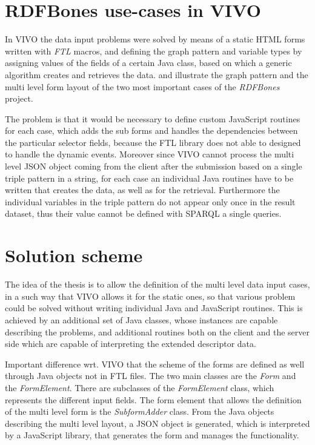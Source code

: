 \section{RDFBones use-cases in VIVO}

In VIVO the data input problems were solved by means of a static HTML forms written with \textit{FTL} macros, and defining the graph pattern and variable types by assigning values of the fields of a certain Java class, based on which a generic algorithm creates and retrieves the data.  and  illustrate the graph pattern and the multi level form layout of the two most important cases of the \textit{RDFBones} project. 



The problem is that it would be necessary to define custom JavaScript routines for each case, which adds the sub forms and handles the dependencies between the particular selector fields, because the FTL library does not able to designed to handle the dynamic events. Moreover since VIVO cannot process the multi level JSON object coming from the client after the submission based on a single triple pattern in a string, for each case an individual Java routines have to be written that creates the data, as well as for the retrieval. Furthermore the individual variables in the triple pattern do not appear only once in the result dataset, thus their value cannot be defined with SPARQL a single queries. 

\section{Solution scheme}

The idea of the thesis is to allow the definition of the multi level data input cases, in a such way that VIVO allows it for the static ones, so that various problem could be solved without writing individual Java and JavaScript routines. This is achieved by an additional set of Java classes, whose instances are capable describing the problems, and additional routines both on the client and the server side which are capable of interpreting the extended descriptor data.

Important difference wrt. VIVO that the scheme of the forms are defined as well through Java objects not in FTL files. The two main classes are the \textit{Form} and the \textit{FormElement}. There are subclasses of the \textit{FormElement} class, which represents the different input fields. The form element that allows the definition of the multi level form is the \textit{SubformAdder} class. From the Java objects describing the multi level layout, a JSON object is generated, which is interpreted by a JavaScript library, that generates the form and manages the functionality.

